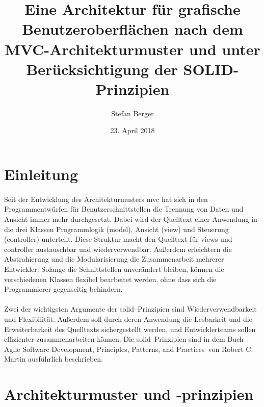 \documentclass{article}
\begin{document}
\title{
  Eine Architektur für grafische Benutzeroberflächen nach dem MVC-Architekturmuster und unter Berücksichtigung der SOLID-Prinzipien
}
\author{Stefan Berger}
\date{23. April 2018}
\clearpage\maketitle
\thispagestyle{empty}
\newpage

\setcounter{page}{1}
\tableofcontents
\newpage

\begin{abstract}

\end{abstract}

\section{Einleitung}
\paragraph{}
Seit der Entwicklung des Architekturmusters \gls{mvc} hat sich in den  Programmentwürfen für Benutzerschnittstellen die Trennung von Daten und Ansicht immer mehr durchgesetzt. Dabei wird der Quelltext einer Anwendung in die drei Klassen Programmlogik (\gls{model}), Ansicht (\gls{view}) und Steuerung (\gls{controller}) unterteilt. Diese Struktur macht den Quelltext für \gls{view}s und \gls{controller} austauschbar und wiederverwendbar. Außerdem erleichtern die Abstrahierung und die Modularisierung die Zusammenarbeit mehrerer Entwickler. Solange die Schnittstellen unverändert bleiben, können die verschiedenen Klassen flexibel bearbeitet werden, ohne dass sich die Programmierer gegenseitig behindern.

\paragraph{}
Zwei der wichtigsten Argumente der \gls{solid}--Prinzipien sind Wiederverwendbarkeit und Flexibilität. Außerdem soll durch deren Anwendung die Lesbarkeit und die Erweiterbarkeit des Quelltexts sichergestellt werden, und Entwicklerteams sollen effizienter zusammenarbeiten können. Die \gls{solid}--Prinzipien sind in dem Buch \glqq Agile Software Development, Principles, Patterns, and Practices\grqq \ von Robert C. Martin ausführlich beschrieben.

\section{Architekturmuster und -prinzipien}
\end{document}
